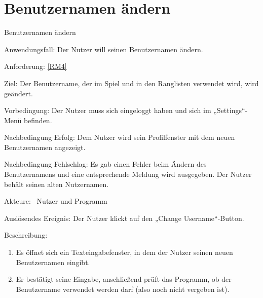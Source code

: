\section{Benutzernamen \"andern}
\begin{function}{50}{Benutzernamen ändern}
\item[Anwendungsfall:] Der Nutzer will seinen Benutzernamen ändern.
\item[Anforderung:] \ref{RM4}
\item[Ziel:] Der Benutzername, der im Spiel und in den Ranglisten verwendet wird, wird geändert.
\item[Vorbedingung:] Der Nutzer muss sich eingeloggt haben und sich im „Settings“-Menü befinden.
\item[Nachbedingung Erfolg:]  Dem Nutzer wird sein Profilfenster mit dem neuen Benutzernamen angezeigt.
\item[Nachbedingung Fehlschlag:] Es gab einen Fehler beim Ändern des Benutzernamens und eine entsprechende Meldung wird ausgegeben. Der Nutzer behält seinen alten Nutzernamen.
\item[Akteure:] ~Nutzer und Programm
\item[Auslösendes Ereignis:] Der Nutzer klickt auf den „Change Username“-Button.
\item[Beschreibung:] ~
\begin{enumerate}
  \item  Es öffnet sich ein Texteingabefenster, in dem der Nutzer seinen neuen Benutzernamen eingibt.
  \item  Er bestätigt seine Eingabe, anschließend prüft das Programm, ob der Benutzername verwendet werden darf (also noch nicht vergeben ist).
\end{enumerate}
\end{function}

